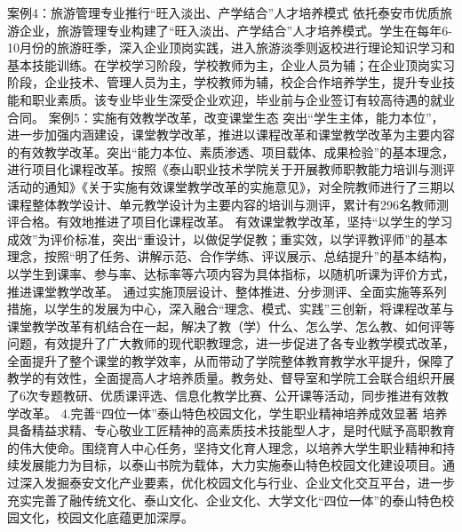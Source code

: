 案例4：旅游管理专业推行“旺入淡出、产学结合”人才培养模式
依托泰安市优质旅游企业，旅游管理专业构建了“旺入淡出、产学结合”人才培养模式。学生在每年6-10月份的旅游旺季，深入企业顶岗实践，进入旅游淡季则返校进行理论知识学习和基本技能训练。在学校学习阶段，学校教师为主，企业人员为辅；在企业顶岗实习阶段，企业技术、管理人员为主，学校教师为辅，校企合作培养学生，提升专业技能和职业素质。该专业毕业生深受企业欢迎，毕业前与企业签订有较高待遇的就业合同。
案例5：实施有效教学改革，改变课堂生态
突出“学生主体，能力本位”，进一步加强内涵建设，课堂教学改革，推进以课程改革和课堂教学改革为主要内容的有效教学改革。突出“能力本位、素质渗透、项目载体、成果检验”的基本理念，进行项目化课程改革。按照《泰山职业技术学院关于开展教师职教能力培训与测评活动的通知》《关于实施有效课堂教学改革的实施意见》，对全院教师进行了三期以课程整体教学设计、单元教学设计为主要内容的培训与测评，累计有296名教师测评合格。有效地推进了项目化课程改革。
有效课堂教学改革，坚持“以学生的学习成效”为评价标准，突出“重设计，以做促学促教；重实效，以学评教评师”的基本理念，按照“明了任务、讲解示范、合作学练、评议展示、总结提升”的基本结构，以学生到课率、参与率、达标率等六项内容为具体指标，以随机听课为评价方式，推进课堂教学改革。
通过实施顶层设计、整体推进、分步测评、全面实施等系列措施，以学生的发展为中心，深入融合“理念、模式、实践”三创新，将课程改革与课堂教学改革有机结合在一起，解决了教（学）什么、怎么学、怎么教、如何评等问题，有效提升了广大教师的现代职教理念，进一步促进了各专业教学模式改革，全面提升了整个课堂的教学效率，从而带动了学院整体教育教学水平提升，保障了教学的有效性，全面提高人才培养质量。教务处、督导室和学院工会联合组织开展了6次专题教研、优质课评选、信息化教学比赛、公开课等活动，同步推进有效教学改革。
4.完善“四位一体”泰山特色校园文化，学生职业精神培养成效显著
培养具备精益求精、专心敬业工匠精神的高素质技术技能型人才，是时代赋予高职教育的伟大使命。围绕育人中心任务，坚持文化育人理念，以培养大学生职业精神和持续发展能力为目标，以泰山书院为载体，大力实施泰山特色校园文化建设项目。通过深入发掘泰安文化产业要素，优化校园文化与行业、企业文化交互平台，进一步充实完善了融传统文化、泰山文化、企业文化、大学文化“四位一体”的泰山特色校园文化，校园文化底蕴更加深厚。








